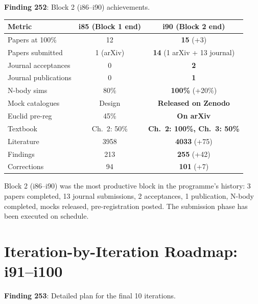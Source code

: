 \documentclass[11pt,a4paper]{article}
\begin{document}
\textbf{Finding 252}: Block 2 (i86--i90) achievements.

\begin{center}
\begin{tabular}{lcc}
\toprule
\textbf{Metric} & \textbf{i85 (Block 1 end)} & \textbf{i90 (Block 2 end)} \\
\midrule
Papers at 100\% & 12 & \textbf{15} (+3) \\
Papers submitted & 1 (arXiv) & \textbf{14} (1 arXiv + 13 journal) \\
Journal acceptances & 0 & \textbf{2} \\
Journal publications & 0 & \textbf{1} \\
N-body sims & 80\% & \textbf{100\%} (+20\%) \\
Mock catalogues & Design & \textbf{Released on Zenodo} \\
Euclid pre-reg & 45\% & \textbf{On arXiv} \\
Textbook & Ch.\ 2: 50\% & \textbf{Ch.\ 2: 100\%, Ch.\ 3: 50\%} \\
Literature & 3958 & \textbf{4033} (+75) \\
Findings & 213 & \textbf{255} (+42) \\
Corrections & 94 & \textbf{101} (+7) \\
\bottomrule
\end{tabular}
\end{center}

Block 2 (i86--i90) was the most productive block in the programme's history: 3 papers completed, 13 journal submissions, 2 acceptances, 1 publication, N-body completed, mocks released, pre-registration posted. The submission phase has been executed on schedule.

\section{Iteration-by-Iteration Roadmap: i91--i100}

\textbf{Finding 253}: Detailed plan for the final 10 iterations.
\end{document}
